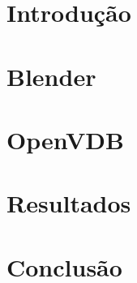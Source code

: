 \documentclass[12pt, a4paper, oneside]{book}
\begin{document}
%
 
\thispagestyle{empty}

\tableofcontents

\chapter{Introdução}



\chapter{Blender}
\label{blender}



\chapter{OpenVDB}
\label{data_struct}



\chapter{Resultados}
\label{resultados}



\chapter{Conclusão}
\label{conclusao}





\iffalse
1. introdução (4)
 1.1 definição do problema / objetivo
 1.2 motivação
 1.3 sobre o projeto pessoal

2. estrutura de dados (10)
 2.1 definição
 2.2 relação com outras estruturas

3. blender (10)
 3.1 textura 
  3.1.1 definição
  3.1.2 mapeamento
  3.1.3 tiles
  3.1.4 3d
 3.2 sistemas de coordenadas
  3.2.1 WCS
  3.2.2 ObjSpace
  3.2.3 coordenadas da textura, mapeamento uv
3.3 shaders / OSL
 3.3.1 interface com estruturas / textura

4. resultados (5)
 4.1 imagens
 4.2 referências à teoria
 4.3 tempo / benchmark

5. conclusão
 5.1 desafios encontrados
 5.2 análise resultados
 5.3 ganhos pessoais / disciplinas / projetos 

\fi
\end{document}
